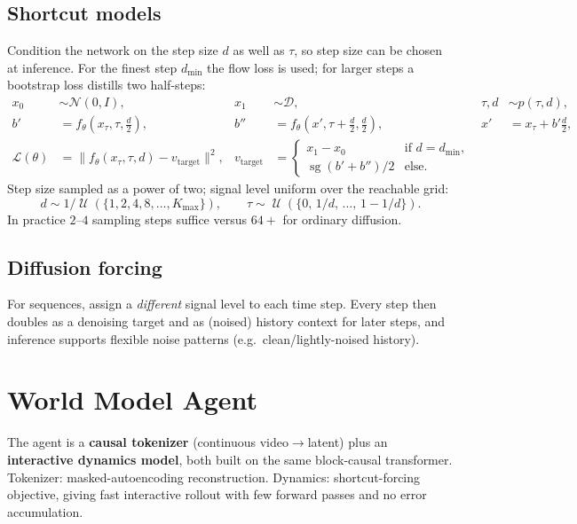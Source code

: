 \documentclass[11pt]{article}
\newcommand{\sg}{\operatorname{sg}}
\DeclareMathOperator{\Unif}{\mathcal{U}}
\begin{document}
\subsection{Shortcut models}
Condition the network on the step size $d$ as well as $\tau$, so step size can be
chosen at inference. For the finest step $d_{\min}$ the flow loss is used; for larger
steps a bootstrap loss distills two half-steps:
\begin{align}
  x_0 &\sim \mathcal{N}(0,I), & x_1 &\sim \mathcal{D}, & \tau,d &\sim p(\tau,d), \\
  b' &= f_\theta(x_\tau,\tau,\tfrac{d}{2}), &
  b'' &= f_\theta(x',\tau+\tfrac{d}{2},\tfrac{d}{2}), &
  x' &= x_\tau + b'\tfrac{d}{2}, \\
  \mathcal{L}(\theta) &= \big\| f_\theta(x_\tau,\tau,d) - v_{\text{target}} \big\|^2,
  &v_{\text{target}} &=
  \begin{cases}
    x_1 - x_0 & \text{if } d = d_{\min}, \\
    \sg(b' + b'')/2 & \text{else.}
  \end{cases}
\end{align}
Step size sampled as a power of two; signal level uniform over the reachable grid:
\begin{equation}
  d \sim 1/\Unif(\{1,2,4,8,\dots,K_{\max}\}), \qquad
  \tau \sim \Unif(\{0,\, 1/d,\, \dots,\, 1 - 1/d\}).
\end{equation}
In practice $2$--$4$ sampling steps suffice versus $64+$ for ordinary diffusion.

\subsection{Diffusion forcing}
For sequences, assign a \emph{different} signal level to each time step. Every step
then doubles as a denoising target and as (noised) history context for later steps,
and inference supports flexible noise patterns (e.g.\ clean/lightly-noised history).

\section{World Model Agent}

The agent is a \textbf{causal tokenizer} (continuous video$\to$latent) plus an
\textbf{interactive dynamics model}, both built on the same block-causal transformer.
Tokenizer: masked-autoencoding reconstruction. Dynamics: shortcut-forcing objective,
giving fast interactive rollout with few forward passes and no error accumulation.
\end{document}
